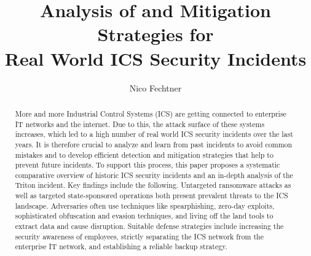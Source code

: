 \documentclass[runningheads]{llncs}
\begin{document}
%
\title{Analysis of and Mitigation Strategies for \\Real World ICS Security Incidents}
%
%
\author{Nico Fechtner}
%
%
%
\maketitle              %
%
\begin{abstract}
More and more Industrial Control Systems (ICS) are getting connected to enterprise IT networks and the internet.
Due to this, the attack surface of these systems increases, which led to a high number of real world ICS security incidents over the last years.
It is therefore crucial to analyze and learn from past incidents to avoid common mistakes and to develop efficient detection and mitigation strategies that help to prevent future incidents.
To support this process, this paper proposes a systematic comparative overview of historic ICS security incidents and an in-depth analysis of the Triton incident.
Key findings include the following.
Untargeted ransomware attacks as well as targeted state-sponsored operations both present prevalent threats to the ICS landscape.
Adversaries often use techniques like spearphishing, zero-day exploits, sophisticated obfuscation and evasion techniques, and living off the land tools to extract data and cause disruption.
Suitable defense strategies include increasing the security awareness of employees, strictly separating the ICS network from the enterprise IT network, and establishing a reliable backup strategy.

\end{abstract}
%
%
%
\end{document}

